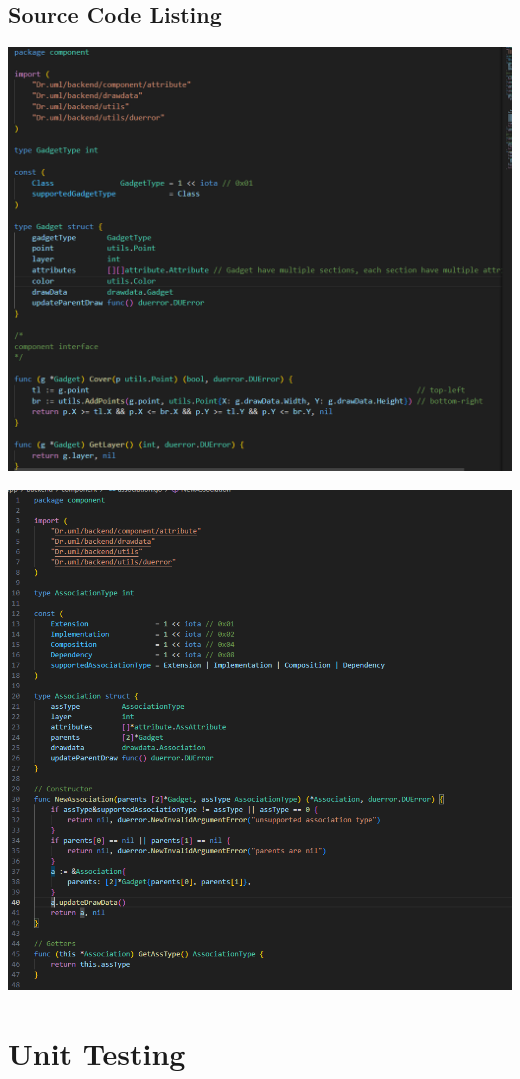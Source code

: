 \documentclass[12pt]{article}
\begin{document}
    \subsection{Source Code Listing}
    \includegraphics[width=0.95\linewidth]
    {assets/hw5/snapshot_gadget_code}


    \includegraphics[width=0.95\linewidth]
    {assets/hw5/snapshot_association_code}


    \section{Unit Testing}
\end{document}
